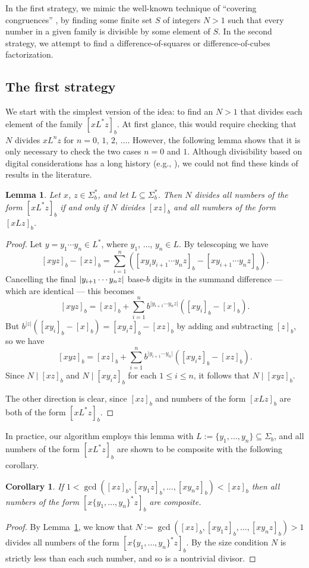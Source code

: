 \documentclass[12pt]{article}
\DeclarePairedDelimiter\abs{\lvert}{\rvert}
\theoremstyle{plain}
\newtheorem{corollary}[theorem]{Corollary}
\newtheorem{lemma}[theorem]{Lemma}
\theoremstyle{definition}
\theoremstyle{remark}
\newcommand{\0}{\mathtt{0}}
\newcommand{\1}{\mathtt{1}}
\newcommand{\2}{\mathtt{2}}
\newcommand{\3}{\mathtt{3}}
\newcommand{\4}{\mathtt{4}}
\newcommand{\5}{\mathtt{5}}
\newcommand{\6}{\mathtt{6}}
\newcommand{\7}{\mathtt{7}}
\newcommand{\8}{\mathtt{8}}
\newcommand{\9}{\mathtt{9}}
\begin{document}
In the first strategy, we mimic the well-known technique of ``covering
congruences'' \cite{Choi},
by finding some finite set $S$ of integers $N > 1$ such that
every number in a given family is divisible by some element of $S$.
In the second strategy, we attempt to find a
difference-of-squares or difference-of-cubes factorization.

\subsection{The first strategy}

We start with the simplest version of the idea:  to find 
an $N > 1$ that divides each element of the family $[xL^*z]_b$.
At first glance, this would require
checking that $N$ divides $xL^nz$ for $n=0$, $1$, $2$, $\dotsc$.
However, the following lemma shows that it is only necessary to check
the two cases $n=0$ and $1$.  Although divisibility based on digital
considerations has a long history (e.g., \cite[Chap.~XII]{Dick}),
we could not find these kinds of results in the literature.

\begin{lemma}\label{lemone}
Let $x$, $z\in \Sigma^*_b$, and let $L\subseteq\Sigma^*_b$.
Then 
$N$ divides all numbers of the form $[xL^*z]_b$
if and only if 
$N$ divides $[xz]_b$ and all numbers of the form $[xLz]_b$.
\end{lemma}
\begin{proof}%
Let $y=y_1\dotsm y_n\in L^*$, where $y_1$, $\dotsc$, $y_n\in L$.  
By telescoping we have
\[ [xyz]_b - [xz]_b = \sum_{i=1}^{n}([xy_{i}y_{i+1}\dotsm y_n z]_b-[xy_{i+1}\dotsm y_n z]_b) . \]
Cancelling the final $\abs{y_{i+1}\dotsm y_nz}$ base-$b$ digits in the summand difference ---
which are identical --- this becomes
\[ [xyz]_b = [xz]_b + \sum_{i=1}^{n}b^{\lvert{y_{i+1}\dotsm y_n z}\rvert}([xy_i]_b-[x]_b) . \]
But $b^{\lvert z\rvert}([xy_i]_b-[x]_b)=[xy_iz]_b-[xz]_b$ by 
adding and subtracting $[z]_b$, so we have
\[ [xyz]_b = [xz]_b + \sum_{i=1}^{n}b^{\vert{y_{i+1}\dotsm y_n}\rvert}([xy_iz]_b-[xz]_b) . \]
Since $N\mid[xz]_b$ and $N\mid[xy_iz]_b$ for each $1\leq i\leq n$,
 it follows that $N\mid[xyz]_b$.
 
The other direction is clear, since $[xz]_b$ and numbers of the 
form $[xLz]_b$ are both of the form $[xL^*z]_b$.
\end{proof}

In practice, our algorithm employs this lemma with 
$L:=\{y_1,\dotsc,y_n\}\subseteq\Sigma_b$, and all numbers of the form
$[xL^*z]_b$ are shown to be composite with the following corollary.
\begin{corollary}\label{corone}
If $1<\gcd([xz]_b,[xy_1z]_b,\dotsc,[xy_nz]_b)<[xz]_b$
 then all numbers of the form $[x\{y_1,\dotsc,y_n\}^*z]_b$ are composite.
\end{corollary}
\begin{proof}
By Lemma~\ref{lemone}, we know
that $N:=\gcd([xz]_b,[xy_1z]_b,\dotsc,[xy_nz]_b)>1$ 
divides all numbers of the form $[x\{y_1,\dotsc,y_n\}^*z]_b$.
By the size condition $N$ is strictly less than each such number, and
so is a nontrivial divisor.
\end{proof}
\end{document}
